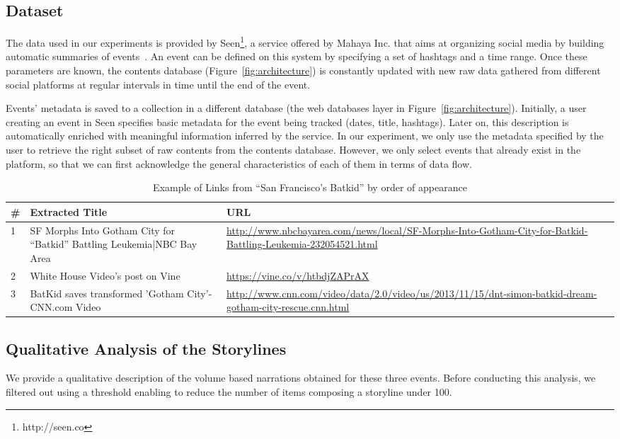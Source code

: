 \documentclass{sig-alternate}
\begin{document}
\subsection{Dataset}
\label{sec:dataset}
The data used in our experiments is provided by Seen\footnote{http://seen.co}, a service offered by Mahaya Inc. that aims at organizing social media by building automatic summaries of events~\cite{SeenWired}. An event can be defined on this system by specifying a set of hashtags and a time range. Once these parameters are known, the contents database (Figure~\ref{fig:architecture}) is constantly updated with new raw data gathered from different social platforms at regular intervals in time until the end of the event.

Events' metadata is saved to a collection in a different database (the web databases layer in Figure~\ref{fig:architecture}). Initially, a user creating an event in Seen specifies basic metadata for the event being tracked (dates, title, hashtags). Later on, this description is automatically enriched with meaningful information inferred by the service. In our experiment, we only use the metadata specified by the user to retrieve the right subset of raw contents from the contents database. However, we only select events that already exist in the platform, so that we can first acknowledge the general characteristics of each of them in terms of data flow.

\begin{table}[htbp]
\begin{tabular}{| p{0.2cm} | p{3.5cm} | p{3.8cm} |}
  \hline
  \textbf{\#} & \textbf{Extracted Title} & \textbf{URL} \\
  \hline
  1 & SF Morphs Into Gotham City for ``Batkid'' Battling Leukemia|NBC Bay Area & \url{http://www.nbcbayarea.com/news/local/SF-Morphs-Into-Gotham-City-for-Batkid-Battling-Leukemia-232054521.html} \\
\hline
  2 &White House Video's post on Vine &\url{https://vine.co/v/htbdjZAPrAX} \\
\hline
  3 & BatKid saves transformed 'Gotham City'-CNN.com Video&\url{http://www.cnn.com/video/data/2.0/video/us/2013/11/15/dnt-simon-batkid-dream-gotham-city-rescue.cnn.html} \\
\hline
\end{tabular}
\caption{Example of Links from ``San Francisco's Batkid'' by order of appearance}
\label{tab:sfbatkid}
\end{table}

\subsection{Qualitative Analysis of the Storylines}
\label{sec:storylines}
We provide a qualitative description of the volume based narrations obtained for these three events. Before conducting this analysis, we filtered out using a threshold enabling to reduce the number of items composing a storyline under 100.
\end{document}
